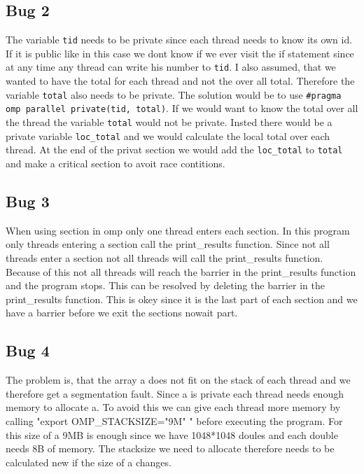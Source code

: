 \documentclass[unicode,11pt,a4paper,oneside,numbers=endperiod,openany]{scrartcl}
\begin{document}
\subsection{Bug 2}
The variable \texttt{tid} needs to be private since each thread needs to know its own id.
If it is public like in this case we dont know if we ever visit the if statement since at any time any thread can write his number to \texttt{tid}.
I also assumed, that we wanted to have the total for each thread and not the over all total. Therefore the variable \texttt{total} also needs to be private.
The solution would be to use \texttt{\#pragma omp parallel private(tid, total)}.
If we would want to know the total over all the thread the variable \texttt{total} would not be private.
Insted there would be a private variable \texttt{loc\_total} and we would calculate the local total over each thread.
At the end of the privat section we would add the \texttt{loc\_total} to \texttt{total} and make a critical section to avoit race contitions.

\subsection{Bug 3}
When using section in omp only one thread enters each section. In this program only threads entering a section call the print\_results function.
Since not all threads enter a section not all threads will call the print\_results function.
Because of this not all threads will reach the barrier in the print\_results function and the program stops.
This can be resolved by deleting the barrier in the print\_results function.
This is okey since it is the last part of each section and we have a barrier before we exit the sections nowait part.

\subsection{Bug 4}
The problem is, that the array a does not fit on the stack of each thread and we therefore get a segmentation fault.
Since a is private each thread needs enough memory to allocate a.
To avoid this we can give each thread more memory by calling "export OMP\_STACKSIZE="9M" " before executing the program.
For this size of a 9MB is enough since we have 1048*1048 doules and each double needs 8B of memory.
The stacksize we need to allocate therefore needs to be calculated new if the size of a changes.
\end{document}
